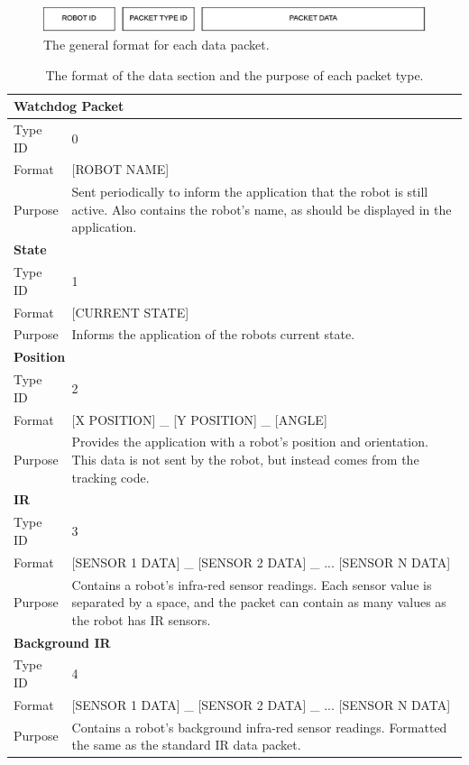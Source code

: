 \begin{figure}
	\centering
	\includegraphics[scale=0.3]{Figures/DataFormat.png}
	\decoRule
	\caption[Data Format]{The general format for each data packet.}
	\label{fig:DataFormat}
\end{figure}

\begin{longtable}{ l p{12cm} }
\caption[Data Format]{The format of the data section and the purpose of each packet type.}\\
 \hline
 \multicolumn{2}{p{12cm}}{\textbf{Watchdog Packet}}\\
 \hline
 Type ID & 0 \\
 Format & [ROBOT NAME]\\
 Purpose & Sent periodically to inform the application that the robot is still active. Also contains the robot's name, as should be displayed in the application.\\
 
 \hline
 \multicolumn{2}{p{12cm}}{\textbf{State}}\\
 \hline
 Type ID & 1 \\
 Format & [CURRENT STATE]\\
 Purpose & Informs the application of the robots current state.\\
 
 \hline
 \multicolumn{2}{p{12cm}}{\textbf{Position}}\\
 \hline
 Type ID & 2 \\
 Format & [X POSITION] \_ [Y POSITION] \_ [ANGLE]\\
 Purpose & Provides the application with a robot's position and orientation. This data is not sent by the robot, but instead comes from the tracking code.\\
 
 \hline
 \multicolumn{2}{p{12cm}}{\textbf{IR}}\\
 \hline
 Type ID & 3 \\
 Format & [SENSOR 1 DATA] \_ [SENSOR 2 DATA] \_ ... [SENSOR N DATA] \\
 Purpose & Contains a robot's infra-red sensor readings. Each sensor value is separated by a space, and the packet can contain as many values as the robot has IR sensors. \\
 
 \hline
 \multicolumn{2}{p{12cm}}{\textbf{Background IR}}\\
 \hline
 Type ID & 4 \\
 Format & [SENSOR 1 DATA] \_ [SENSOR 2 DATA] \_ ... [SENSOR N DATA] \\
 Purpose & Contains a robot's background infra-red sensor readings. Formatted the same as the standard IR data packet.\\
 

\end{longtable}
